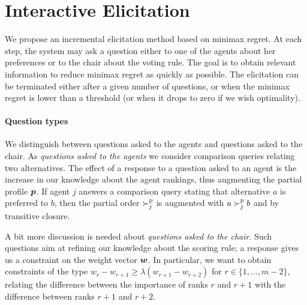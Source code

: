 \documentclass{article}
\begin{document}
\section{Interactive Elicitation} 
\label{sec:elicit}
We propose an incremental elicitation method based on minimax regret.
At each step, the system may ask a question either to one of the agents about her preferences or to the chair about the voting rule. 
The goal is to obtain relevant information to reduce minimax regret as quickly as possible.
The elicitation can be terminated either after a given number of questions, or when the minimax regret is lower than a threshold (or when it drops to zero if we wish optimality).



\paragraph{Question types}
We distinguish between questions asked to the agents and questions asked to the chair.
As {\em questions asked to the agents} we consider comparison queries relating two alternatives.
The effect of a response to a question asked to an agent is the increase in our knowledge about the agent rankings, thus augmenting the partial profile ${\bm{p}}$. 
If agent $j$ answers a comparison query stating that alternative $a$ is preferred to $b$, then the partial order $\succ^\text{p}_j$ is augmented with $a \succ^\text{p}_j b$ and by transitive closure.

A bit more discussion is needed about {\em questions asked to the chair}.
Such questions aim at refining our knowledge about the scoring rule; a response gives us a constraint on the weight vector $\bm{w}$.
In particular, we want to obtain constraints of the type $w_{r} - w_{r+1} \geq \lambda (w_{r+1} - w_{r+2})$ for $r \in \{1,\ldots,m-2\}$, relating the difference between the importance of ranks $r$ and $r+1$ with the difference between ranks $r+1$ and $r+2$.
\end{document}
